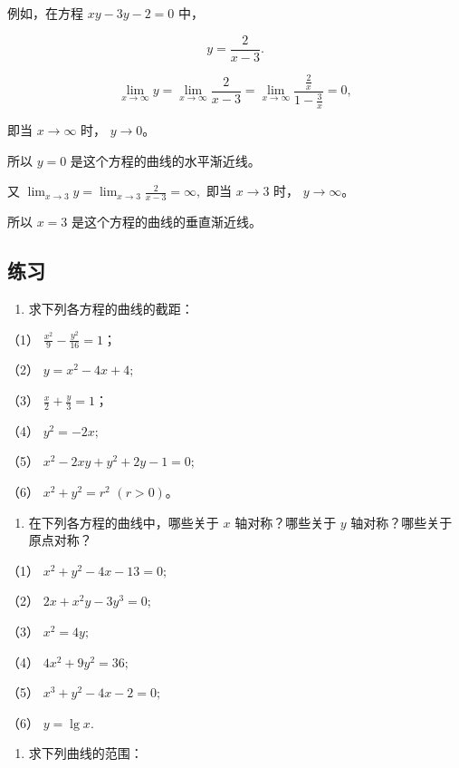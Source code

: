 例如，在方程 \(xy - 3y - 2 = 0\) 中，

\[
y = \frac {2}{x - 3}.
\]

\[
\lim_{x \rightarrow \infty} y = \lim_{x \rightarrow \infty} \frac {2}{x - 3} = \lim_{x \rightarrow \infty} \frac {\frac {2}{x}}{1 - \frac {3}{x}} = 0,
\]

即当 \(x \to \infty\) 时， \(y \to 0\)。

所以 \(y = 0\) 是这个方程的曲线的水平渐近线。

又 \(\lim_{x\to 3}y = \lim_{x\to 3}\frac{2}{x - 3} = \infty ,\) 即当
\(x \to 3\) 时， \(y \to \infty\)。

所以 \(x = 3\) 是这个方程的曲线的垂直渐近线。

\subsection{练习}\label{ux7ec3ux4e60-3}

\begin{enumerate}
\def\labelenumi{\arabic{enumi}.}
\tightlist
\item
  求下列各方程的曲线的截距：
\end{enumerate}

（1） \(\frac{x^2}{9} - \frac{y^2}{16} = 1\)；

（2） \(y = x^{2} - 4x + 4;\)

（3） \(\frac{x}{2} + \frac{y}{3} = 1\)；

（4） \(y^{2} = -2x;\)

（5） \(x^{2} - 2xy + y^{2} + 2y - 1 = 0;\)

（6） \(x^{2} + y^{2} = r^{2}\) \((r > 0)\)。

\begin{enumerate}
\def\labelenumi{\arabic{enumi}.}
\setcounter{enumi}{1}
\tightlist
\item
  在下列各方程的曲线中，哪些关于 \(x\) 轴对称？哪些关于 \(y\)
  轴对称？哪些关于原点对称？
\end{enumerate}

（1） \(x^{2} + y^{2} - 4x - 13 = 0;\)

（2） \(2x + x^{2}y - 3y^{3} = 0;\)

（3） \(x^{2} = 4y;\)

（4） \(4x^{2} + 9y^{2} = 36;\)

（5） \(x^{3} + y^{2} - 4x - 2 = 0;\)

（6） \(y = \lg x.\)

\begin{enumerate}
\def\labelenumi{\arabic{enumi}.}
\setcounter{enumi}{2}
\tightlist
\item
  求下列曲线的范围：
\end{enumerate}

